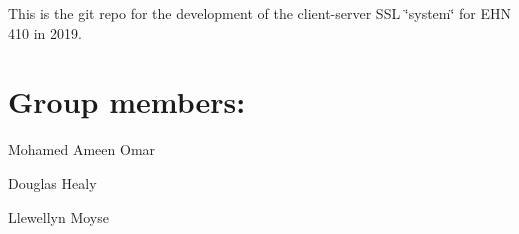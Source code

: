 This is the git repo for the development of the client-\/server S\+SL \char`\"{}system\char`\"{} for E\+HN 410 in 2019.

\section*{Group members\+:}


\begin{DoxyItemize}
\item Mohamed Ameen Omar
\item Douglas Healy
\item Llewellyn Moyse 
\end{DoxyItemize}
